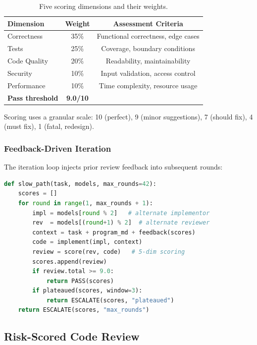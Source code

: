 \documentclass[11pt,a4paper]{article}
\begin{document}
\begin{table}[h]
\centering
\begin{tabular}{lcc}
\toprule
\textbf{Dimension} & \textbf{Weight} & \textbf{Assessment Criteria} \\
\midrule
Correctness & 35\% & Functional correctness, edge cases \\
Tests & 25\% & Coverage, boundary conditions \\
Code Quality & 20\% & Readability, maintainability \\
Security & 10\% & Input validation, access control \\
Performance & 10\% & Time complexity, resource usage \\
\midrule
\textbf{Pass threshold} & \textbf{9.0/10} & \\
\bottomrule
\end{tabular}
\caption{Five scoring dimensions and their weights.}
\label{tab:scoring}
\end{table}

Scoring uses a granular scale: 10 (perfect), 9 (minor suggestions), 7 (should fix), 4 (must fix), 1 (fatal, redesign).

\subsubsection{Feedback-Driven Iteration}

The iteration loop injects prior review feedback into subsequent rounds:

\begin{lstlisting}[frame=none,numbers=none,language=Python]
def slow_path(task, models, max_rounds=42):
    scores = []
    for round in range(1, max_rounds + 1):
        impl = models[round % 2]   # alternate implementor
        rev  = models[(round+1) % 2]  # alternate reviewer
        context = task + program_md + feedback(scores)
        code = implement(impl, context)
        review = score(rev, code)   # 5-dim scoring
        scores.append(review)
        if review.total >= 9.0:
            return PASS(scores)
        if plateaued(scores, window=3):
            return ESCALATE(scores, "plateaued")
    return ESCALATE(scores, "max_rounds")
\end{lstlisting}

\subsection{Risk-Scored Code Review}
\end{document}
